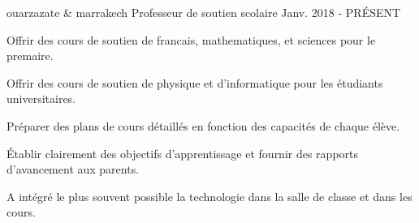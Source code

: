 

\begin{cventries}
%


  \cventry
{ouarzazate \& marrakech} %
{
	Professeur de soutien scolaire
} %
{} %
{Janv. 2018 - PRÉSENT} %
{
	\begin{cvitems} %
		\item {Offrir des cours  de soutien de francais, mathematiques, et sciences pour le premaire.
		}
	            \item {Offrir des cours  de soutien de physique et d'informatique pour les étudiants universitaires.
	    }
		\item {Préparer des plans de cours détaillés en fonction des capacités de chaque élève.
		}
		\item {Établir clairement des objectifs d'apprentissage et fournir des rapports d'avancement aux parents.			
		}
	\item{A intégré le plus souvent possible la technologie dans la salle de classe et dans les cours.}	
		\end{cvitems}
}


 

 

 
 

\end{cventries}
